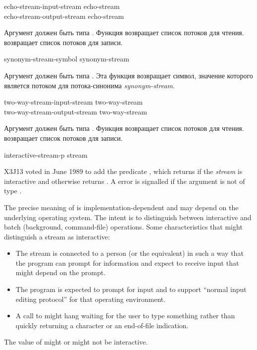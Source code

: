 \begin{defun}[Функция]
echo-stream-input-stream echo-stream \\
echo-stream-output-stream echo-stream

Аргумент должен быть типа .
Функция  возвращает список потоков для чтения.
 возвращает список потоков для записи.
\end{defun}


\begin{defun}[Функция]
synonym-stream-symbol synonym-stream

Аргумент должен быть типа . Эта функция возвращает символ,
значение которого является потоком для потока-синонима \emph{synonym-stream}.
\end{defun}


\begin{defun}[Функция]
two-way-stream-input-stream two-way-stream \\
two-way-stream-output-stream two-way-stream

Аргумент должен быть типа .
Функция  возвращает список потоков для чтения. 
 возвращает список потоков для записи.
\end{defun}


\begin{defun}[Function]
interactive-stream-p stream

X3J13 voted in June 1989  to add the
predicate , which returns 
if the \emph{stream\/} is interactive and otherwise returns .
A  error is signalled if the argument is not of type .

The precise meaning of  is implementation-dependent
and may depend on the underlying operating system.
The intent is to distinguish between interactive and batch (background,
command-file) operations.  Some characteristics that might
distinguish a stream as interactive:
\begin{itemize}
\item The stream is connected to a person (or the equivalent)
in such a way that the program can prompt for information and
expect to receive input that might depend on the prompt.
\item The program is expected to prompt for input and to support
``normal input editing protocol'' for that operating environment.
\item A call to  might hang waiting for the user to type something
rather than quickly returning a character or an end-of-file
indication.
\end{itemize}
The value of  might or might not be interactive.
\end{defun}

